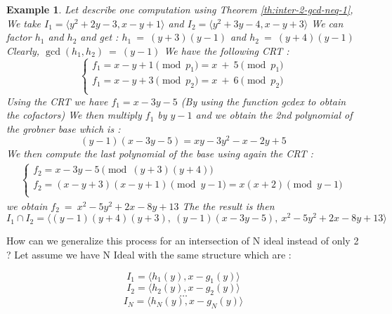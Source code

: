 \documentclass{article}
\newtheorem{example}{Example}[section]
\begin{document}
\begin{flushleft}
\begin{example}
    Let describe one computation using Theorem \ref{th:inter-2-gcd-neq-1},\newline
    We take $I_{1} = \langle y^{2}+2y-3,x-y+1\rangle$ and $I_{2} = \langle y^{2}+3y-4,x-y+3 \rangle$ \newline
    We can factor $h_{1}$ and $h_{2}$ and get : $h_{1}\ =\ (y + 3)(y - 1)$ and $h_{2}\ =\ (y + 4)(y - 1)$ \newline
    Clearly, $\gcd(h_{1},h_{2})\ =\ (y-1)$\newline
    We have the following CRT :
    \begin{displaymath}
        \left\{
            \begin{array}{ll}
            f_{1} = x-y+1 \pmod{p_{1}} = x\ +\ 5 \pmod{p_{1}} \\
            f_{1} = x-y+3 \pmod{p_{2}}  = x\ +\ 6 \pmod{p_{2}}  \\
            \end{array}
        \right.
    \end{displaymath}
    Using the CRT we have $f_{1} = x - 3y - 5$ (By using the function gcdex to obtain the cofactors) \newline
    We then multiply $f_{1}$ by $y-1$ and we obtain the 2nd polynomial of the grobner base which is :
    \[(y-1)(x - 3y - 5) = xy - 3y^2 - x - 2y + 5\]
    We then compute the last polynomial of the base using again the CRT : \newline
    \begin{align*}
        \left\{
            \begin{array}{ll}
            f_{2} = x - 3y - 5     \pmod{(y + 3)(y + 4)} \\
            f_{2} = (x-y+3)(x-y+1) \pmod{y-1}  = x(x+2) \pmod{y-1} \\
            \end{array}
        \right.
    \end{align*}
    we obtain $f_{2}\ =\ x^2 - 5y^2 + 2x - 8y + 13$
    The the result is then \[ I_{1} \cap I_{2} = \langle (y-1)(y+4)(y+3),\ (y-1)(x - 3y - 5),\ x^2 - 5y^2 + 2x - 8y + 13\rangle\]
\end{example}

\end{flushleft}

How can we generalize this process for an intersection of N ideal instead of only 2 ?
Let assume we have N Ideal with the same structure which are : 

\[I_{1} = \langle h_{1}(y),x-g_{1}(y) \rangle \]
\[I_{2} = \langle h_{2}(y),x-g_{2}(y) \rangle \]
\[\dots\]
\[I_{N} = \langle h_{N}(y),x-g_{N}(y) \rangle \]
\end{document}
